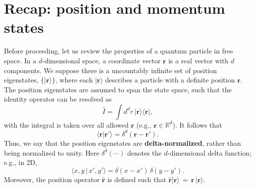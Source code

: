 \documentclass[prx,12pt]{revtex4-2}
\begin{document}
\section{Recap: position and momentum states}
\label{sec:waves}

Before proceeding, let us review the properties of a quantum particle
in free space.  In a $d$-dimensional space, a coordinate vector
$\mathbf{r}$ is a real vector with $d$ components.  We suppose there
is a uncountably infinite set of position eigenstates,
$\{|\mathbf{r}\rangle\}$, where each $|\mathbf{r}\rangle$ describes a
particle with a definite position $\mathbf{r}$.  The position
eigenstates are assumed to span the state space, such that the
identity operator can be resolved as
\begin{equation}
  \hat{I} = \int d^dr \, |\mathbf{r}\rangle \langle\mathbf{r}|,
  \label{Iresol}
\end{equation}
with the integral is taken over all allowed $\mathbf{r}$ (e.g.,
$\mathbf{r} \in \mathbb{R}^d$).  It follows that
\begin{equation}
  \langle \mathbf{r} | \mathbf{r}' \rangle = \delta^d(\mathbf{r}-\mathbf{r}').
  \label{rrprime}
\end{equation}
Thus, we say that the position eigenstates are
\textbf{delta-normalized}, rather than being normalized to unity.
Here $\delta^d(\cdots)$ denotes the $d$-dimensional delta function;
e.g., in 2D,
\begin{equation*}
  \langle x,y \,|\, x',y' \rangle = \delta(x-x') \, \delta(y-y').
\end{equation*}
Moreover, the position operator $\hat{\mathbf{r}}$ is defined such
that $\hat{\mathbf{r}} |\mathbf{r}\rangle \,=\, \mathbf{r}\,
|\mathbf{r}\rangle$.
\end{document}
